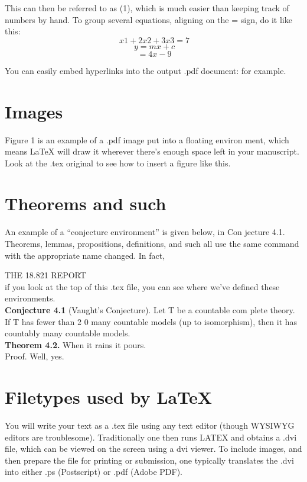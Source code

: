 \documentclass{article}
\begin{document}
This can then be referred to as (1), which is much easier than keeping
track of numbers by hand. To group several equations, aligning on the
= sign, do it like this:\\
\[\
x1 + {2}{x}2 + {3}{x}3 = 7 
\]
\[\
y = {m}{x} + c
\]
 \[\
 = {4}{x}-9\]

You can easily embed {}hyperlinks into the output .pdf document:
\cite{click here} for example.\\
\section{Images}

Figure 1 is an example of a .pdf image put into a ﬂoating environ­
ment, which means LaTeX will draw it wherever there’s enough space
left in your manuscript. Look at the .tex original to see how to insert
a ﬁgure like this.\\
\section{Theorems and such}
An example of a “conjecture environment” is given below, in Con­
jecture 4.1. Theorems, lemmas, propositions, deﬁnitions, and such all
use the same command with the appropriate name changed. In fact,\\

\newpage

THE 18.821 REPORT\\

if you look at the top of this .tex ﬁle, you can see where we’ve deﬁned
these environments.\\

\textbf{Conjecture 4.1} (Vaught’s Conjecture). Let T be a countable com­
plete theory. If T has fewer than 2  0 many countable models (up to isomorphism), then it has countably many countable models.\\
\textbf{Theorem 4.2.} When it rains it pours.\\
Proof. Well, yes.\\ 


\section{Filetypes used by LaTeX}
You will write your text as a .tex ﬁle using any text editor (though
WYSIWYG editors are troublesome). Traditionally one then runs
LATEX and obtains a .dvi ﬁle, which can be viewed on the screen using a
dvi viewer. To include images, and then prepare the ﬁle for printing or
submission, one typically translates the .dvi into either .ps (Postscript)
or .pdf (Adobe PDF).\\ 
\end{document}
